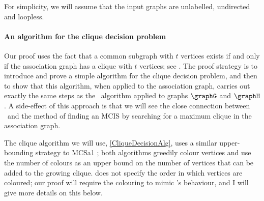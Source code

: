 For simplicity, we will assume that the input graphs are unlabelled,
undirected and loopless.

\paragraph{An algorithm for the clique decision problem} Our proof uses the
fact that a common subgraph with $t$ vertices exists if and only if the
association graph has a clique with $t$ vertices; see
.  The proof strategy is to introduce and prove
a simple algorithm for the clique decision problem, and then to show that this
algorithm, when applied to the association graph, carries out exactly the same
steps as the \McSplit\ algorithm applied to graphs $\graphG$ and $\graphH$.  A
side-effect of this approach is that we will see the close connection between
\McSplit\ and the method of finding an MCIS by searching for a maximum clique in the
association graph.

The clique algorithm we will use, \cref{CliqueDecisionAlg},
uses a similar upper-bounding strategy to MCSa1 \citep{DBLP:journals/algorithms/Prosser12,DBLP:journals/ieicet/TomitaSHW13,DBLP:conf/cp/McCreeshNPS16};
both algorithms greedily colour vertices and use the number of colours
as an upper bound on the number of vertices that can be added to the growing clique.
 does not specify the order in which vertices are coloured;
our proof will require the colouring to mimic \McSplit's behaviour, and I will give
more details on this below.

